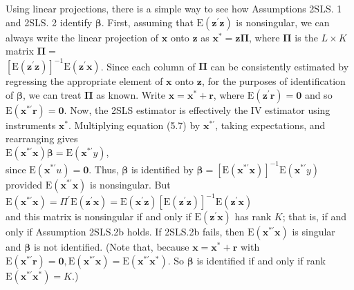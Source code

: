 \documentclass[10pt]{article}
\begin{document}
Using linear projections, there is a simple way to see how Assumptions 2SLS. 1 and 2SLS. 2 identify $\boldsymbol{\beta}$. First, assuming that $\mathrm{E}\left(\mathbf{z}^{\prime} \mathbf{z}\right)$ is nonsingular, we can always write the linear projection of $\mathbf{x}$ onto $\mathbf{z}$ as $\mathbf{x}^{*}=\mathbf{z} \boldsymbol{\Pi}$, where $\boldsymbol{\Pi}$ is the $L \times K$ matrix $\boldsymbol{\Pi}=$\\
$\left[\mathrm{E}\left(\mathbf{z}^{\prime} \mathbf{z}\right)\right]^{-1} \mathrm{E}\left(\mathbf{z}^{\prime} \mathbf{x}\right)$. Since each column of $\boldsymbol{\Pi}$ can be consistently estimated by regressing the appropriate element of $\mathbf{x}$ onto $\mathbf{z}$, for the purposes of identification of $\boldsymbol{\beta}$, we can treat $\boldsymbol{\Pi}$ as known. Write $\mathbf{x}=\mathbf{x}^{*}+\mathbf{r}$, where $\mathrm{E}\left(\mathbf{z}^{\prime} \mathbf{r}\right)=\mathbf{0}$ and so $\mathrm{E}\left(\mathbf{x}^{* \prime} \mathbf{r}\right)=\mathbf{0}$. Now, the 2SLS estimator is effectively the IV estimator using instruments $\mathbf{x}^{*}$. Multiplying equation (5.7) by $\mathbf{x}^{* \prime}$, taking expectations, and rearranging gives\\
$\mathrm{E}\left(\mathbf{x}^{* \prime} \mathbf{x}\right) \boldsymbol{\beta}=\mathrm{E}\left(\mathbf{x}^{* \prime} y\right)$,\\
since $\mathrm{E}\left(\mathbf{x}^{* \prime} u\right)=\mathbf{0}$. Thus, $\boldsymbol{\beta}$ is identified by $\boldsymbol{\beta}=\left[\mathrm{E}\left(\mathbf{x}^{* \prime} \mathbf{x}\right)\right]^{-1} \mathrm{E}\left(\mathbf{x}^{* \prime} y\right)$ provided $\mathrm{E}\left(\mathbf{x}^{* \prime} \mathbf{x}\right)$ is nonsingular. But\\
$\mathrm{E}\left(\mathbf{x}^{* \prime} \mathbf{x}\right)=\Pi^{\prime} \mathrm{E}\left(\mathbf{z}^{\prime} \mathbf{x}\right)=\mathrm{E}\left(\mathbf{x}^{\prime} \mathbf{z}\right)\left[\mathrm{E}\left(\mathbf{z}^{\prime} \mathbf{z}\right)\right]^{-1} \mathrm{E}\left(\mathbf{z}^{\prime} \mathbf{x}\right)$\\
and this matrix is nonsingular if and only if $\mathrm{E}\left(\mathbf{z}^{\prime} \mathbf{x}\right)$ has rank $K$; that is, if and only if Assumption 2SLS.2b holds. If 2SLS.2b fails, then $\mathrm{E}\left(\mathbf{x}^{* \prime} \mathbf{x}\right)$ is singular and $\boldsymbol{\beta}$ is not identified. (Note that, because $\mathbf{x}=\mathbf{x}^{*}+\mathbf{r}$ with $\mathrm{E}\left(\mathbf{x}^{* \prime} \mathbf{r}\right)=\mathbf{0}, \mathrm{E}\left(\mathbf{x}^{* \prime} \mathbf{x}\right)=\mathrm{E}\left(\mathbf{x}^{* \prime} \mathbf{x}^{*}\right)$. So $\boldsymbol{\beta}$ is identified if and only if rank $\mathrm{E}\left(\mathbf{x}^{* \prime} \mathbf{x}^{*}\right)=K$.)
\end{document}
